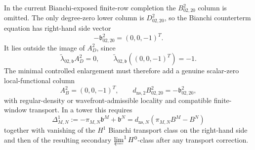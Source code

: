 \documentclass[11pt]{memoir}
\begin{document}
\begin{prop}
  In the current Bianchi-exposed finite-row completion the
  \(B^2_{02,20}\) column is omitted.  The only degree-zero lower column is
  \(D^2_{02,20}\), so the Bianchi counterterm equation has right-hand side
  vector
  \[
    -\mathfrak b^2_{02,20}=(0,0,-1)^T .
  \]
  It lies outside the image of \(A_D^2\), since
  \[
    \widetilde\lambda_{02,\mathfrak b}A_D^2=0,\qquad
    \widetilde\lambda_{02,\mathfrak b}((0,0,-1)^T)=-1 .
  \]
  The minimal controlled enlargement must therefore add a genuine
  scalar-zero local-functional column
  \[
    A_B^2=(0,0,-1)^T,\qquad
    d_{\mathrm{ns},2}B^2_{02,20}
      =-\mathfrak b^2_{02,20},
  \]
  with regular-density or wavefront-admissible locality and compatible
  finite-window transport.  In a tower this requires
  \[
    \Delta^1_{M,N}
    :=
    -\pi_{M,N}\mathfrak b^M+\mathfrak b^N
    =
    d_{\mathrm{ns},N}(\pi_{M,N}B^M-B^N)
  \]
  together with vanishing of the \(H^1\) Bianchi transport class on the
  right-hand side and then of the resulting secondary
	  \(\varprojlim^1H^0\)-class after any transport correction.
\end{prop}
\end{document}

